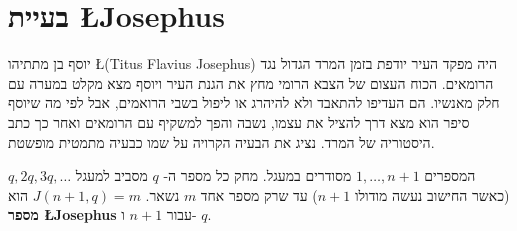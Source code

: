 
\section{בעיית \L{Josephus}}\label{s.josephus}

יוסף בן מתתיהו 
\L{(Titus Flavius Josephus)}
היה מפקד העיר יודפת בזמן המרד הגדול נגד הרומאים. הכוח העצום של הצבא הרומי מחץ את הגנת העיר ויוסף מצא מקלט במערה עם חלק מאנשיו. הם העדיפו להתאבד ולא להיהרג או ליפול בשבי הרואמים, אבל לפי מה שיוסף סיפר הוא מצא דרך להציל את עצמו, נשבה והפך למשקיף עם הרומאים ואחר כך כתב היסטוריה של המרד. נציג את הבעיה הקרויה על שמו כבעיה מתמטית מופשטת.

\begin{definition}
המספרים
$1,\ldots,n\!+\!1$
מסודרים במעגל. מחק כל מספר ה-%
$q$
מסביב למעגל
$q, 2q, 3q, \ldots$
(כאשר החישוב נעשה מודולו
$n\!+\!1$)
עד שרק מספר אחד 
$m$
נשאר.
$J(n+1,q)=m$
הוא
\textbf{מספר \L{Josephus}}
עבור
$n+1$
ו-%
$q$.
\end{definition}

